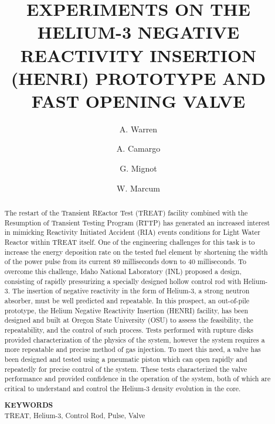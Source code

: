 \documentclass{anstopical-class/ansconf}
\begin{document}
\title{EXPERIMENTS ON THE HELIUM-3 NEGATIVE REACTIVITY INSERTION (HENRI) PROTOTYPE AND FAST OPENING VALVE}

\author{A. Warren}
\author{A. Camargo}
\author{G. Mignot}
\author{W. Marcum}


\maketitle

\begin{abstract}
The restart of the Transient REactor Test (TREAT) facility combined with the Resumption of Transient Testing Program (RTTP) has generated an increased interest in mimicking Reactivity Initiated  Accident (RIA) events conditions for Light Water Reactor within TREAT itself. One of the engineering challenges for this task is to increase the energy deposition rate on the tested fuel element by shortening the width of the  power  pulse  from  its  current  89  milliseconds down  to  40 milliseconds. To overcome  this  challenge, Idaho National Laboratory (INL) proposed a design, consisting of rapidly pressurizing a specially designed hollow control rod with Helium-3. The insertion of negative reactivity in the form of Helium-3, a strong neutron  absorber,  must  be  well  predicted and repeatable.  In  this  prospect,  an  out-of-pile  prototype,  the Helium  Negative  Reactivity  Insertion  (HENRI) facility, has been designed  and  built  at  Oregon  State University (OSU) to  assess  the  feasibility,  the  repeatability, and  the control of such process. Tests performed with rupture disks provided characterization of the physics of the system, however the system requires a more repeatable and precise method of gas injection. To meet this need, a valve has been designed and tested using a pneumatic piston which can open rapidly and repeatedly for precise control of the system. These tests characterized the valve performance and provided confidence in the operation of the system, both of which are critical to understand and control the Helium-3 density evolution in the core.

\raggedleft
\textbf{KEYWORDS}\\
TREAT, Helium-3, Control Rod, Pulse, Valve
\end{abstract}
\end{document}
